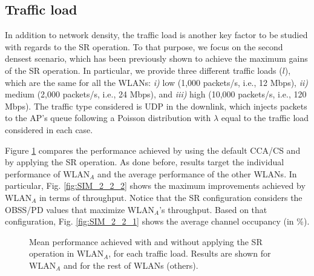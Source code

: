 \documentclass[preprint,12pt]{elsarticle}
\begin{document}
	\subsection{Traffic load}
	\label{section:random_scenarios_traffic_load}
	In addition to network density, the traffic load is another key factor to be studied with regards to the SR operation. To that purpose, we focus on the second densest scenario, which has been previously shown to achieve the maximum gains of the SR operation. In particular, we provide three different traffic loads ($l$), which are the same for all the WLANs: \emph{i)} low (1,000 packets/s, i.e., 12 Mbps), \emph{ii)} medium (2,000 packets/s, i.e., 24 Mbps), and \emph{iii)} high (10,000 packets/s, i.e., 120 Mbps). The traffic type considered is UDP in the downlink, which injects packets to the AP's queue following a Poisson distribution with $\lambda$ equal to the traffic load considered in each case.
	
	Figure \ref{fig:SIM_2_2} compares the performance achieved by using the default CCA/CS and by applying the SR operation. As done before, results target the individual performance of $\text{WLAN}_A$ and the average performance of the other WLANs. In particular, Fig. \ref{fig:SIM_2_2_2} shows the maximum improvements achieved by WLAN$_A$ in terms of throughput. Notice that the SR configuration considers the OBSS/PD values that maximize WLAN$_A$'s throughput. Based on that configuration, Fig. \ref{fig:SIM_2_2_1} shows the average channel occupancy (in \%).
	
	\begin{figure}[ht!]
		\centering		
		\caption{Mean performance achieved with and without applying the SR operation in $\text{WLAN}_A$, for each traffic load. Results are shown for $\text{WLAN}_A$ and for the rest of WLANs (others).}
		\label{fig:SIM_2_2}
	\end{figure}
	
\end{document}
